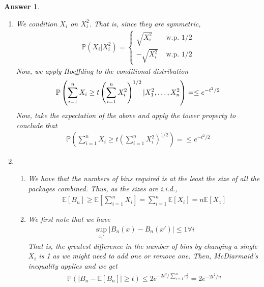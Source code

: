 \documentclass[12pt]{article}
\theoremstyle{colon}
\newtheorem*{answer}{Answer}
\begin{document}
\begin{answer}
  \leavevmode
  \begin{enumerate}[label=\arabic*)]
    \item We condition $X_i$ on $X_i^2$. That is, since they are symmetric,
      \begin{gather*}
        \mathbb{P}(X_i | X_i^2) = \begin{cases}
          \sqrt{X_i^2} & \text{ w.p. } 1/2 \\
          -\sqrt{X_i^2} & \text{ w.p. } 1/2
        \end{cases}
      \end{gather*}
      Now, we apply Hoeffding to the conditional distribution
      \begin{gather*}
        \mathbb{P}\left(\sum_{i=1}^n X_i \geq t \left( \sum_{i=1}^n X_i^2 \right)^{1/2} | X_1^2, \mathellipsis, X_n^2 \right) = \leq e^{-t^2/2}
      \end{gather*}
      Now, take the expectation of the above and apply the tower property to conclude that
      \begin{gather*}
        \mathbb{P}\left(\sum_{i=1}^n X_i \geq t \left( \sum_{i=1}^n X_i^2 \right)^{1/2} \right) = \leq e^{-t^2/2}
      \end{gather*}

    \item
      \begin{enumerate}[label=\alph*)]
        \item We have that the numbers of bins required is at the least the size of all the packages combined. Thus, as the sizes are i.i.d.,
          \begin{gather*}
            \mathbb{E}[B_n] \geq \mathbb{E}[\sum_{i=1}^n X_i] = \sum_{i=1}^n \mathbb{E}[X_i] = n \mathbb{E}[X_1]
          \end{gather*}

        \item We first note that we have
          \begin{gather*}
            \sup_{x_i'} \lvert B_n(x) - B_n(x') \rvert \leq 1 \forall i
          \end{gather*}
          That is, the greatest difference in the number of bins by changing a single $X_i$ is 1 as we might need to add one or remove one. Then, McDiarmaid's inequality applies and we get
          \begin{gather*}
            \mathbb{P}( \lvert B_n - \mathbb{E}[B_n] \rvert \geq t) \leq 2 e^{- 2t^2 / \sum_{i=1}^n c_i^2} = 2 e^{- 2t^2 / n}
          \end{gather*}
      \end{enumerate}


\end{enumerate}
\end{answer}
\end{document}
